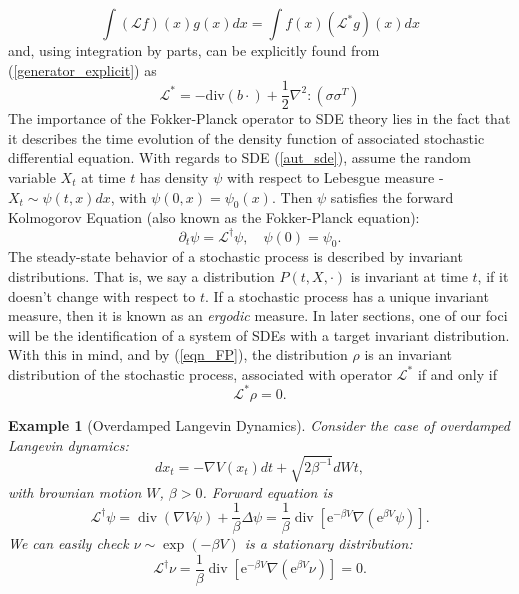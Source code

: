 \documentclass[11pt, twoside]{report}
\newtheorem{example}[theorem]{Example}
\begin{document}
\begin{equation}
    \int (\mathcal{L}f)(x)g(x) dx = \int f(x)(\mathcal{L}^*g)(x) dx
\end{equation}
and, using integration by parts, can be explicitly found from (\ref{generator_explicit}) as
\begin{equation} \label{gen_dag_explicit}
    \mathcal{L}^* = -\mathrm{div}(b\cdot) + \frac{1}{2} \nabla^2:(\sigma \sigma^T)
\end{equation}
The importance of the Fokker-Planck operator to SDE theory lies in the fact that it describes the time evolution of the density function of associated stochastic differential equation. With regards to SDE (\ref{aut_sde}), assume the random variable $X_t$ at time $t$ has density $\psi$ with respect to Lebesgue measure - $X_t \sim \psi(t,x) dx$, with $\psi(0,x) = \psi_0(x).$ Then $\psi$ satisfies the forward Kolmogorov Equation (also known as the Fokker-Planck equation):
\begin{equation} \label{eqn_FP}
    \partial_t \psi = \mathcal{L}^\dagger \psi, \quad \psi(0) = \psi_0.
\end{equation}
The steady-state behavior of a stochastic process is described by invariant distributions. That is, we say a distribution $P(t,X,\cdot)$ is invariant at time $t$, if it doesn't change with respect to $t$. If a stochastic process has a unique invariant measure, then it is known as an \textit{ergodic} measure. In later sections, one of our foci will be the identification of a system of SDEs with a target invariant distribution. With this in mind, and by (\ref{eqn_FP}), the distribution $\rho$ is an invariant distribution of the stochastic process, associated with operator $\mathcal{L}^*$ if and only if
\begin{equation}\label{eqn_FP_inv}
    \mathcal{L}^* \rho = 0.
\end{equation}


\begin{example}[Overdamped Langevin Dynamics]
Consider the case of overdamped Langevin dynamics:
\[dx_t = -\nabla V(x_t) dt + \sqrt{2\beta^{-1}}dWt,\]
with brownian motion $W$, $\beta  > 0$.
    Forward equation is
    $$
\mathcal{L}^{\dagger} \psi=\operatorname{div}(\nabla V \psi)+\frac{1}{\beta} \Delta \psi=\frac{1}{\beta} \operatorname{div}\left[\mathrm{e}^{-\beta V} \nabla\left(\mathrm{e}^{\beta V} \psi\right)\right] .
$$
    We can easily check $\nu \sim \exp{(-\beta V)}$ is a stationary distribution:
    \[\mathcal{L}^{\dagger} \nu = \frac{1}{\beta} \operatorname{div}\left[\mathrm{e}^{-\beta V} \nabla\left(\mathrm{e}^{\beta V} \nu\right)\right] = 0.\]
\end{example}
\end{document}
